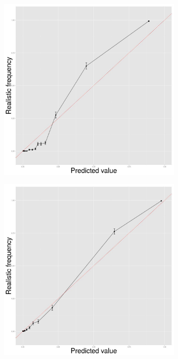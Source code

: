 \begin{figure}[t]
\begin{subfigure}{0.32 \textwidth}
  \centering
  \includegraphics[width=\linewidth]{pos_tweet_hmm.jpg}
  \caption{}
 \end{subfigure}
\begin{subfigure}{0.32 \textwidth}
  \centering
  \includegraphics[width=\linewidth]{pos_tweet_crf.jpg}

\end{subfigure}
\end{figure}
